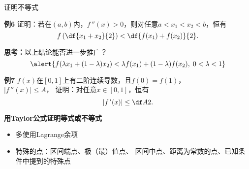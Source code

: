 

\begin{frame}{证明不等式}
	\linespread{1.2}\pause 
	\begin{exampleblock}{{\bf 例6}\hfill}
		证明：若在$(a,b)$内，$f\,''(x)>0$，则对任意$a<x_1<x_2<b$，恒有
		$$f\left(\df{x_1+x_2}{2}\right)<\df{f(x_1)+f(x_2)}{2}.$$
	\end{exampleblock}\pause 
	{\bf 思考：}以上结论能否进一步推广？\pause 
	$$\alert{f(\lambda x_1+(1-\lambda)x_2)<\lambda
	f(x_1)+(1-\lambda)f(x_2),\;0<\lambda<1}$$
\end{frame}

\begin{frame}
	\linespread{1.5}
	\begin{exampleblock}{{\bf 例7}\hfill }
		$f(x)$在$[0,1]$上有二阶连续导数，且$f(0)=f(1)$，\\$|f\,''(x)|\leq A$，
		证明：对任意$x\in[0,1]$，恒有
		$$|f\,'(x)|\leq\df A2.$$
	\end{exampleblock}\pause 
	{\bf 用Taylor公式证明等式或不等式}\pause 
	\begin{itemize}
	  \item \alert{多使用Lagrange余项}\pause 
	  \item \alert{特殊的点：\pause 区间端点、\pause 极（最）值点、\pause
	  区间中点、\pause 距离为常数的点、\pause 已知条件中提到的特殊点}
	\end{itemize}
\end{frame}

